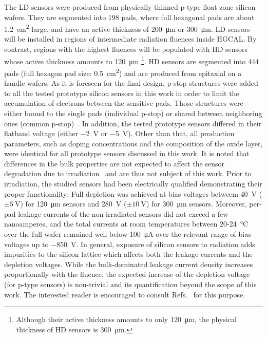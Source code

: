 The LD sensors were produced from physically thinned p-type float zone silicon wafers.
They are segmented into 198 pads, where full hexagonal pads are about \SI{1.2}{\centi\metre\squared} large, and have an active thickness of \SI{200}{\micro\meter} or \SI{300}{\micro\meter}.
LD sensors will be installed in regions of intermediate radiation fluences inside HGCAL.
By contrast, regions with the highest fluences will be populated with HD sensors whose active thickness amounts to \SI{120}{\micro\meter} \footnote{Although their active thickness amounts to only \SI{120}{\micro\meter}, the physical thickness of HD sensors is \SI{300}{\micro\meter}.}.\newline
HD sensors are segmented into 444 pads (full hexagon pad size: \SI{0.5}{\centi\metre\squared}) and are produced from epitaxial on a handle wafers.
As it is foreseen for the final design, p-stop structures were added to all the tested prototype silicon sensors in this work in order to limit the accumulation of electrons between the sensitive pads.
Those structures were either bound to the single pads (individual p-stop) or shared between neighboring ones (common p-stop)~\cite{Brondolin_2020}.
In addition, the tested prototype sensors differed in their flatband voltage (either \SI{-2}{\volt} or \SI{-5}{\volt}).
Other than that, all production parameters, such as doping concentrations and the composition of the oxide layer, were identical for all prototype sensors discussed in this work.
It is noted that differences in the bulk properties are not expected to affect the sensor degradation due to irradiation~\cite{MOLL199987} and are thus not subject of this work.
\newline
Prior to irradiation, the studied sensors had been electrically qualified demonstrating their proper functionality:
Full depletion was achieved at bias voltages betweem \SI{40}{\volt} ($\pm\SI{5}{\volt}$) for \SI{120}{\micro\metre} sensors and \SI{280}{\volt} ($\pm\SI{10}{\volt}$) for \SI{300}{\micro\meter} sensors. 
Moreover, per-pad leakage currents of the non-irradiated sensors did not exceed a few nanoamperes, and the total currents at room temperatures between 20-\SI{24}{\celsius} over the full wafer remained well below \SI{100}{\micro\ampere} over the relevant range of bias voltages up to \SI{-850}{\volt}. \newline
In general, exposure of silicon sensors to radiation adds impurities to the silicon lattice which affects both the leakage currents and the depletion voltages. 
While the bulk-dominated leakage current density increases proportionally with the fluence, the expected increase of the depletion voltage (for p-type sensors) is non-trivial and its quantification beyond the scope of this work.
The interested reader is encouraged to consult Refs.~\cite{moll:SiDamages,LINDSTROM200330} for this purpose.
